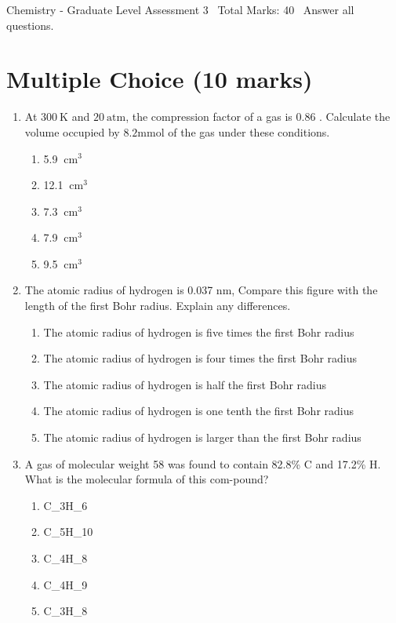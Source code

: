 \documentclass[12pt]{article}
\begin{document}
\begin{center}
Chemistry - Graduate Level Assessment 3 \
Total Marks: 40 \
Answer all questions.
\end{center}

\section*{Multiple Choice (10 marks)}
\begin{enumerate}[label=\arabic*.]
\item At $300 \mathrm{~K}$ and $20 \mathrm{~atm}$, the compression factor of a gas is 0.86 .
Calculate the volume occupied by $8.2 \mathrm{mmol}$ of the gas under these conditions.
\begin{enumerate}[label=(\alph*)]
    \item 5.9 $\mathrm{~cm}^3$
    \item 12.1 $\mathrm{~cm}^3$
    \item 7.3 $\mathrm{~cm}^3$
    \item 7.9 $\mathrm{~cm}^3$
    \item 9.5 $\mathrm{~cm}^3$
\end{enumerate}
\item The atomic radius of hydrogen is 0.037 nm, Compare this figure with the length of the
first Bohr radius. Explain any differences.
\begin{enumerate}[label=(\alph*)]
    \item The atomic radius of hydrogen is five times the first Bohr radius
    \item The atomic radius of hydrogen is four times the first Bohr radius
    \item The atomic radius of hydrogen is half the first Bohr radius
    \item The atomic radius of hydrogen is one tenth the first Bohr radius
    \item The atomic radius of hydrogen is larger than the first Bohr radius
\end{enumerate}
\item A gas of molecular weight 58 was found to contain 82.8\% C and 17.2\% H. What is the
molecular formula of this com-pound?
\begin{enumerate}[label=(\alph*)]
    \item C\_3H\_6
    \item C\_5H\_10
    \item C\_4H\_8
    \item C\_4H\_9
    \item C\_3H\_8

\end{enumerate}
\end{enumerate}
\end{document}
